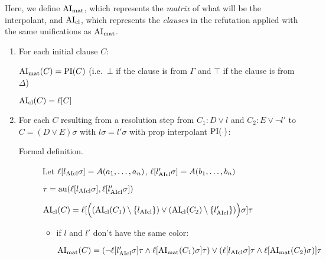 \documentclass[,%
	paper=a4,%
	DIV12, %
	twoside=false,%
	liststotoc,
	bibtotoc,
	draft=false,%
	numbers=noendperiod
]{scrartcl}
\begin{document}
Here, we define $\operatorname{AI}_\mathrm{mat}$, which represents the \emph{matrix} of what will be the interpolant, and $\operatorname{AI}_\mathrm{cl}$, which represents the \emph{clauses} in the refutation applied with the same unifications as $\operatorname{AI}_\mathrm{mat}$.

\begin{enumerate}
	\item 
		For each initial clause $C$:

		$\operatorname{AI}_\mathrm{mat}(C) = \operatorname{PI}(C)$ (i.e.~$\bot$ if the clause is from $\Gamma$ and $\top$ if the clause is from $\Delta$)

		$\operatorname{AI}_\mathrm{cl}(C) = \ell[C]$

	\item
		For each $C$ resulting from a resolution step from $C_1: D\lor l$ and $C_2: E\lor \lnot l'$ to $C = (D \lor E)\sigma$ with $l\sigma = l'\sigma$ with prop interpolant $\operatorname{PI}(\cdot)$:


		\begin{description}
			\item[Formal definition.]

				Let 
				$\ell[l_{\operatorname{AIcl}}\sigma] = A(a_1, \dotsc, a_n)$, $\ell[l_{\operatorname{AIcl}}'\sigma] = A(b_1, \dotsc, b_n)$

				$\tau = \operatorname{au}(\ell[l_{\operatorname{AIcl}}\sigma], \ell[l'_{\operatorname{AIcl}}\sigma])$

				$\operatorname{AI}_\mathrm{cl}(C) =
				\ell[\Big( (\operatorname{AI}_\mathrm{cl}(C_1) \setminus \{l_{\operatorname{AIcl}}\}) \lor (\operatorname{AI}_\mathrm{cl}(C_2)\setminus \{l_{\operatorname{AIcl}}'\}) \Big)\sigma] \tau$ 



				\begin{itemize}
					\item if $l$ and $l'$ don't have the same color:

						$\operatorname{AI}_\mathrm{mat}(C) =
						(\lnot {\ell[l'\ensuremath{_{\operatorname{AIcl}}}\sigma]\tau} \land \ell[\operatorname{AI}_\mathrm{mat}(C_1)\sigma]\tau) \lor
						(\ell[l_{\operatorname{AIcl}}\sigma]\tau \land \ell[\operatorname{AI}_\mathrm{mat}(C_2)\sigma) ]\tau
						$






\end{itemize}
\end{description}
\end{enumerate}
\end{document}
